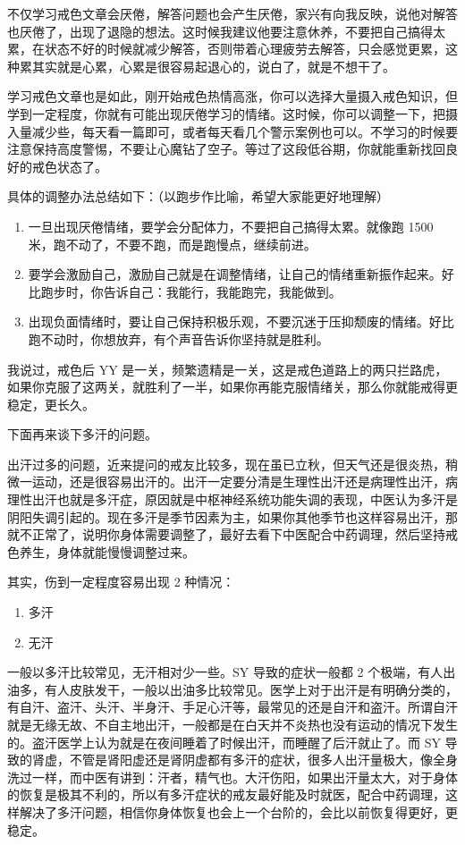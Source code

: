 \documentclass[fontset=founder]{ctexart}
\begin{document}
不仅学习戒色文章会厌倦，解答问题也会产生厌倦，家兴有向我反映，说他对解答也厌倦了，出现了退隐的想法。这时候我建议他要注意休养，不要把自己搞得太累，在状态不好的时候就减少解答，否则带着心理疲劳去解答，只会感觉更累，这种累其实就是心累，心累是很容易起退心的，说白了，就是不想干了。

学习戒色文章也是如此，刚开始戒色热情高涨，你可以选择大量摄入戒色知识，但学到一定程度，你就有可能出现厌倦学习的情绪。这时候，你可以调整一下，把摄入量减少些，每天看一篇即可，或者每天看几个警示案例也可以。不学习的时候要注意保持高度警惕，不要让心魔钻了空子。等过了这段低谷期，你就能重新找回良好的戒色状态了。


具体的调整办法总结如下：（以跑步作比喻，希望大家能更好地理解）

\begin{enumerate}
    \item 一旦出现厌倦情绪，要学会分配体力，不要把自己搞得太累。就像跑 1500 米，跑不动了，不要不跑，而是跑慢点，继续前进。
    \item 要学会激励自己，激励自己就是在调整情绪，让自己的情绪重新振作起来。好比跑步时，你告诉自己：我能行，我能跑完，我能做到。
    \item 出现负面情绪时，要让自己保持积极乐观，不要沉迷于压抑颓废的情绪。好比跑不动时，你想放弃，有个声音告诉你坚持就是胜利。
\end{enumerate}

我说过，戒色后 YY 是一关，频繁遗精是一关，这是戒色道路上的两只拦路虎，如果你克服了这两关，就胜利了一半，如果你再能克服情绪关，那么你就能戒得更稳定，更长久。

下面再来谈下多汗的问题。

出汗过多的问题，近来提问的戒友比较多，现在虽已立秋，但天气还是很炎热，稍微一运动，还是很容易出汗的。出汗一定要分清是生理性出汗还是病理性出汗，病理性出汗也就是多汗症，原因就是中枢神经系统功能失调的表现，中医认为多汗是阴阳失调引起的。现在多汗是季节因素为主，如果你其他季节也这样容易出汗，那就不正常了，说明你身体需要调整了，最好去看下中医配合中药调理，然后坚持戒色养生，身体就能慢慢调整过来。

其实，伤到一定程度容易出现 2 种情况：

\begin{enumerate}
    \item 多汗
    \item 无汗
\end{enumerate}

一般以多汗比较常见，无汗相对少一些。SY 导致的症状一般都 2 个极端，有人出油多，有人皮肤发干，一般以出油多比较常见。医学上对于出汗是有明确分类的，有自汗、盗汗、头汗、半身汗、手足心汗等，最常见的还是自汗和盗汗。所谓自汗就是无缘无故、不自主地出汗，一般都是在白天并不炎热也没有运动的情况下发生的。盗汗医学上认为就是在夜间睡着了时候出汗，而睡醒了后汗就止了。而 SY 导致的肾虚，不管是肾阳虚还是肾阴虚都有多汗的症状，很多人出汗量极大，像全身洗过一样，而中医有讲到：汗者，精气也。大汗伤阳，如果出汗量太大，对于身体的恢复是极其不利的，所以有多汗症状的戒友最好能及时就医，配合中药调理，这样解决了多汗问题，相信你身体恢复也会上一个台阶的，会比以前恢复得更好，更稳定。
\end{document}
